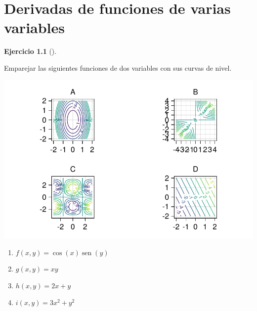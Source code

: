 \documentclass[
  a4paper,
]{scrreport}
\theoremstyle{definition}
\newtheorem{exercise}{Ejercicio}[chapter]
\theoremstyle{remark}
\begin{document}
\begin{tcolorbox}[enhanced jigsaw, bottomrule=.15mm, breakable, colframe=quarto-callout-tip-color-frame, toprule=.15mm, opacityback=0, left=2mm, opacitybacktitle=0.6, colback=white, toptitle=1mm, titlerule=0mm, bottomtitle=1mm, arc=.35mm, title=\textcolor{quarto-callout-tip-color}{\faLightbulb}\hspace{0.5em}{Solución}, rightrule=.15mm, colbacktitle=quarto-callout-tip-color!10!white, leftrule=.75mm, coltitle=black]

\end{tcolorbox}


\hypertarget{derivadas-de-funciones-de-varias-variables}{%
\chapter{Derivadas de funciones de varias
variables}\label{derivadas-de-funciones-de-varias-variables}}

\begin{exercise}[]\protect\hypertarget{exr-curvas-nivel}{}\label{exr-curvas-nivel}

Emparejar las siguientes funciones de dos variables con sus curvas de
nivel.

\includegraphics{11-derivadas-funciones-varias-variables_files/figure-pdf/cell-2-output-1.pdf}

\begin{enumerate}
\def\labelenumi{\alph{enumi}.}
\item
  \(f(x,y) = \cos(x)\operatorname{sen}(y)\)
\item
  \(g(x,y) = xy\)
\item
  \(h(x,y) = 2x+y\)
\item
  \(i(x,y) = 3x^2 + y^2\)
\end{enumerate}

\end{exercise}
\end{document}
